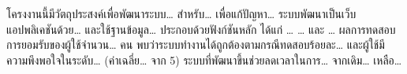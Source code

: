 %
โครงงานนี้มีวัตถุประสงค์เพื่อพัฒนาระบบ\ldots{} สำหรับ\ldots{} เพื่อแก้ปัญหา\ldots{}
ระบบพัฒนาเป็นเว็บแอปพลิเคชันด้วย\ldots{} และใช้ฐานข้อมูล\ldots{}
ประกอบด้วยฟังก์ชันหลัก ได้แก่ \ldots{} \ldots{} และ \ldots{}
ผลการทดสอบการยอมรับของผู้ใช้จำนวน\ldots{} คน พบว่าระบบทำงานได้ถูกต้องตามกรณีทดสอบร้อยละ\ldots{}
และผู้ใช้มีความพึงพอใจในระดับ\ldots{} (ค่าเฉลี่ย\ldots{} จาก 5)
ระบบที่พัฒนาขึ้นช่วยลดเวลาในการ\ldots{} จากเดิม\ldots{} เหลือ\ldots{}
